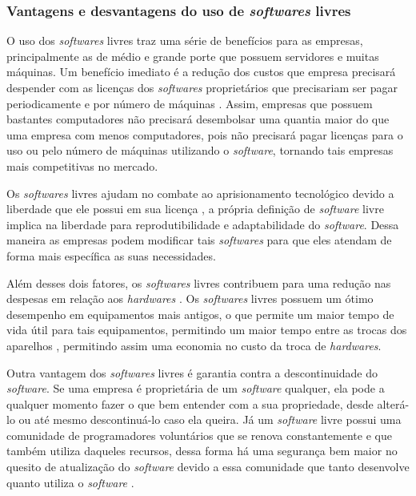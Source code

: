 \documentclass[12pt]{article}
\begin{document}
\subsubsection{Vantagens e desvantagens do uso de \textit{softwares} livres }

O uso dos \textit{softwares} livres traz uma série de benefícios para as empresas, principalmente as de médio e grande porte que possuem servidores e muitas máquinas. Um benefício imediato é a redução dos custos que empresa precisará despender com as licenças dos \textit{softwares} proprietários que precisariam ser pagar periodicamente e por número de máquinas \cite{sebrae2020}. Assim, empresas que possuem bastantes computadores não precisará desembolsar uma quantia maior do que uma empresa com menos computadores, pois não precisará pagar licenças para o uso ou pelo número de máquinas utilizando o \textit{software}, tornando tais empresas mais competitivas no mercado.

Os \textit{softwares} livres ajudam no combate ao aprisionamento tecnológico devido a liberdade que ele possui em sua licença \cite{saleh2004}, a própria definição de \textit{software} livre implica na liberdade para reprodutibilidade e adaptabilidade do \textit{software}. Dessa maneira as empresas podem modificar tais \textit{softwares} para que eles atendam de forma mais específica as suas necessidades.

Além desses dois fatores, os \textit{softwares} livres contribuem para uma redução nas despesas em relação aos \textit{hardwares} \cite{saleh2004}. Os \textit{softwares} livres possuem um ótimo desempenho em equipamentos mais antigos, o que permite um maior tempo de vida útil para tais equipamentos, permitindo um maior tempo entre as trocas dos aparelhos \cite{Gusman2002}, permitindo assim uma economia no custo da troca de \textit{hardwares}.

Outra vantagem dos \textit{softwares} livres é garantia contra a descontinuidade do \textit{software}. Se uma empresa é proprietária de um \textit{software} qualquer, ela pode a qualquer momento fazer o que bem entender com a sua propriedade, desde alterá-lo ou até mesmo descontinuá-lo caso ela queira. Já um \textit{software} livre possui uma comunidade de programadores voluntários que se renova constantemente e que também utiliza daqueles recursos, dessa forma há uma segurança bem maior no quesito de atualização do \textit{software} devido a essa comunidade que tanto desenvolve quanto utiliza o \textit{software} \cite{saleh2004}.
\end{document}
